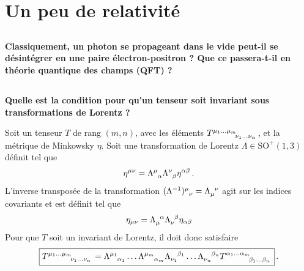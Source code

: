 \documentclass{article}
\numberwithin{equation}{section}
\theoremstyle{solution}
\begin{document}
\section{Un peu de relativité}

\subsection{}
\textbf{Classiquement, un photon se propageant dans le vide peut-il se désintégrer en une paire
électron-positron ? 
Que ce passera-t-il en théorie quantique des champs (QFT) ?}
\subsection{}
\textbf{Quelle est la condition pour qu’un tenseur soit invariant sous transformations de Lorentz ?}
\vspace{2ex}

Soit un tenseur $T$ de rang $(m,n)$, avec les éléments $T\indices{^{\mu_1\dots \mu_m}_{\nu_1\dots\nu_n}}$, et la métrique de Minkowsky $\eta$. Soit une transformation de 
Lorentz $\Lambda \in \mathrm{SO}^{+}(1,3)$ définit tel que
\begin{equation}
        \eta^{\mu \nu} = \Lambda\indices{^{\mu}_\alpha} \Lambda\indices{^{\nu}_\beta} \eta^{\alpha\beta}\, .
\end{equation} 
L'inverse transposée de la transformation $(\Lambda^{-1})\indices{^{\mu}_{\nu}} = \Lambda\indices{_\mu^{\nu}}$ agit sur les indices covariants et est définit 
tel que
\begin{equation}
        \eta_{\mu \nu}  = \Lambda\indices{_{\mu}^{\alpha}}\Lambda\indices{_{\nu}^{\beta}}\eta_{\alpha \beta}
\end{equation} 
Pour que $T$ soit un invariant de Lorentz, il doit donc satisfaire
\begin{equation}
        \boxed{ T\indices{^{\mu_1\dots\mu_m}_{\nu_1\dots\nu_n}} = \Lambda\indices{^{\mu_1}_{\alpha_1}} \dots \Lambda\indices{^{\mu_m}_{\alpha_m}} 
        \Lambda\indices{_{\nu_1}^{\beta_1}}\dots \Lambda\indices{_{\nu_n}^{\beta_n}} T\indices{^{\alpha_1\dots \alpha_m}_{\beta_1 \dots \beta_n}}} \, .
\end{equation}
\end{document}
